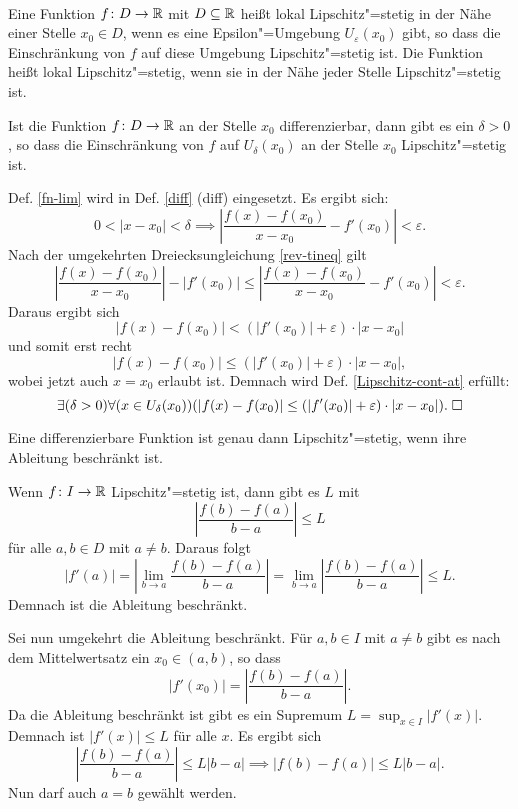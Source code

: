 \begin{Definition}\mbox{}\\
Eine Funktion $f\colon D\to\mathbb R$ mit $D\subseteq\mathbb R$ heißt lokal
Lipschitz"=stetig in der Nähe einer Stelle $x_0\in D$, wenn es eine
Epsilon"=Umgebung $U_\varepsilon(x_0)$ gibt, so dass die Einschränkung
von $f$ auf diese Umgebung Lipschitz"=stetig ist. Die Funktion heißt
lokal Lipschitz"=stetig, wenn sie in der Nähe jeder Stelle
Lipschitz"=stetig ist.
\end{Definition}

\begin{Satz}\label{diff-nh-Lipschitz-cont-at}
Ist die Funktion $f\colon D\to\mathbb R$ an der Stelle $x_0$ differenzierbar,
dann gibt es ein $\delta>0$, so dass die Einschränkung von $f$
auf $U_\delta(x_0)$ an der Stelle $x_0$ Lipschitz"=stetig ist.
\end{Satz}

\begin{Beweis}
Def. \ref{fn-lim} wird in Def. \ref{diff} (diff) eingesetzt.
Es ergibt sich:
\[0<|x-x_0|<\delta\implies
\left|\frac{f(x)-f(x_0)}{x-x_0}-f'(x_0)\right|<\varepsilon.\]
Nach der umgekehrten Dreiecksungleichung \ref{rev-tineq} gilt
\[\left|\frac{f(x)-f(x_0)}{x-x_0}\right|-|f'(x_0)| \le
\left|\frac{f(x)-f(x_0)}{x-x_0}-f'(x_0)\right|
< \varepsilon.\]
Daraus ergibt sich
\[|f(x)-f(x_0)| < (|f'(x_0)|+\varepsilon)\cdot |x-x_0|\]
und somit erst recht
\[|f(x)-f(x_0)| \le (|f'(x_0)|+\varepsilon)\cdot |x-x_0|,\]
wobei jetzt auch $x=x_0$ erlaubt ist. Demnach wird Def.
\ref{Lipschitz-cont-at} erfüllt:
\[\exists(\delta>0)\forall(x\in U_\delta(x_0))(
|f(x)-f(x_0)| \le (|f'(x_0)|+\varepsilon)\cdot |x-x_0|).\;\square\]
\end{Beweis}

\begin{Satz}\label{diff-bounded-Lipschitz-cont}
Eine differenzierbare Funktion ist genau dann Lipschitz"=stetig,
wenn ihre Ableitung beschränkt ist.
\end{Satz}
Wenn $f\colon I\to\mathbb R$ Lipschitz"=stetig ist, dann gibt es $L$ mit
\[\left|\frac{f(b)-f(a)}{b-a}\right|\le L\]
für alle $a,b\in D$ mit $a\ne b$. Daraus folgt
\[|f'(a)| = \left|\lim_{b\to a} \frac{f(b)-f(a)}{b-a}\right|
= \lim_{b\to a} \left|\frac{f(b)-f(a)}{b-a}\right|
\le L.\]
Demnach ist die Ableitung beschränkt.

Sei nun umgekehrt die Ableitung beschränkt. Für $a,b\in I$ mit $a\ne b$
gibt es nach dem Mittelwertsatz ein $x_0\in(a,b)$, so dass
\[|f'(x_0)| = \left|\frac{f(b)-f(a)}{b-a}\right|.\]
Da die Ableitung beschränkt ist gibt es ein Supremum
$L = \sup_{x\in I} |f'(x)|$. Demnach ist $|f'(x)|\le L$ für alle $x$.
Es ergibt sich
\[\left|\frac{f(b)-f(a)}{b-a}\right|\le L|b-a| \implies |f(b)-f(a)|\le L|b-a|.\]
Nun darf auch $a=b$ gewählt werden.\;\qedsymbol

